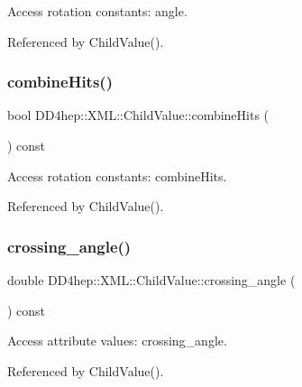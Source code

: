 Access rotation constants\+: angle. 



Referenced by Child\+Value().

\hypertarget{struct_d_d4hep_1_1_x_m_l_1_1_child_value_aed718aeaac9e1ee48a03ded09832909e}{}\label{struct_d_d4hep_1_1_x_m_l_1_1_child_value_aed718aeaac9e1ee48a03ded09832909e} 
\subsubsection{\texorpdfstring{combine\+Hits()}{combineHits()}}
{\footnotesize\ttfamily bool D\+D4hep\+::\+X\+M\+L\+::\+Child\+Value\+::combine\+Hits (\begin{DoxyParamCaption}{ }\end{DoxyParamCaption}) const}



Access rotation constants\+: combine\+Hits. 



Referenced by Child\+Value().

\hypertarget{struct_d_d4hep_1_1_x_m_l_1_1_child_value_a96ba52debc279109ab0a7440614fdb3d}{}\label{struct_d_d4hep_1_1_x_m_l_1_1_child_value_a96ba52debc279109ab0a7440614fdb3d} 
\subsubsection{\texorpdfstring{crossing\+\_\+angle()}{crossing\_angle()}}
{\footnotesize\ttfamily double D\+D4hep\+::\+X\+M\+L\+::\+Child\+Value\+::crossing\+\_\+angle (\begin{DoxyParamCaption}{ }\end{DoxyParamCaption}) const}



Access attribute values\+: crossing\+\_\+angle. 



Referenced by Child\+Value().

\hypertarget{struct_d_d4hep_1_1_x_m_l_1_1_child_value_a017711036f2a3bcf8fc78dc68e70e240}{}\label{struct_d_d4hep_1_1_x_m_l_1_1_child_value_a017711036f2a3bcf8fc78dc68e70e240} 
